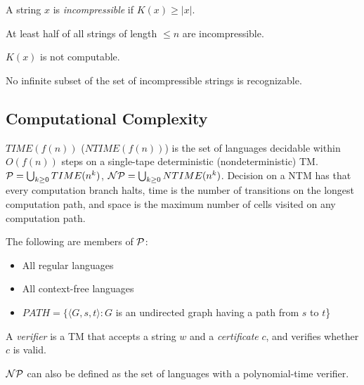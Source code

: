 \begin{definition}
A string $x$ is \emph{incompressible} if $K(x) \ge |x|$.
\end{definition}

\begin{theorem}
At least half of all strings of length $\le n$ are incompressible.
\end{theorem}

\begin{theorem}
$K(x)$ is not computable.
\end{theorem}

\begin{theorem}
No infinite subset of the set of incompressible strings is recognizable.
\end{theorem}

\subsection{Computational Complexity}

\begin{definition}
$TIME(f(n))$ ($NTIME(f(n))$) is the set of languages decidable within $O(f(n))$ steps on a single-tape deterministic (nondeterministic) TM. $\mathcal{P} = \bigcup_{k \ge 0}TIME(n^k)$, $\mathcal{NP} = \bigcup_{k \ge 0}NTIME(n^k)$. Decision on a NTM has that every computation branch halts, time is the number of transitions on the longest computation path, and space is the maximum number of cells visited on any computation path.
\end{definition}

\begin{theorem}
The following are members of $\mathcal{P}$:
\begin{itemize}
\item All regular languages
\item All context-free languages
\item $PATH = \{\langle G, s, t\rangle : G$ is an undirected graph having a path from $s$ to $t$\}
\end{itemize}
\end{theorem}

\begin{definition}
A \emph{verifier} is a TM that accepts a string $w$ and a \emph{certificate} $c$, and verifies whether $c$ is valid.
\end{definition}

\begin{theorem}
$\mathcal{NP}$ can also be defined as the set of languages with a polynomial-time verifier.
\end{theorem}

